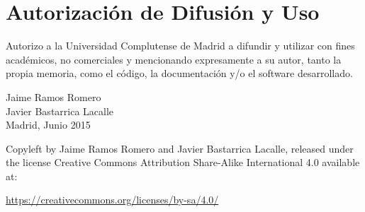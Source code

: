 
\newpage
\thispagestyle{empty}
\chapter*{Autorización de Difusión y Uso}
\vfill
Autorizo a la Universidad Complutense de Madrid a difundir y utilizar con fines académicos, no comerciales y mencionando expresamente a su autor, tanto la propia memoria, como el código, la documentación y/o el software desarrollado. 
\begin{center}
  \vfill
  {\Large Jaime Ramos Romero\\
	  Javier Bastarrica Lacalle\\}
  \vspace*{4cm}
  {\Large Madrid, Junio 2015}
  \vfill
\end{center}
  Copyleft by Jaime Ramos Romero and Javier Bastarrica Lacalle, released under the license Creative Commons Attribution Share-Alike International 4.0 available at:
\begin{center}
\url{https://creativecommons.org/licenses/by-sa/4.0/}
\end{center}

\newpage
\tableofcontents
\newpage
\setcounter{page}{7}
{\listoffigures \let\cleardoublepage\relax \listoftables}
\newpage
